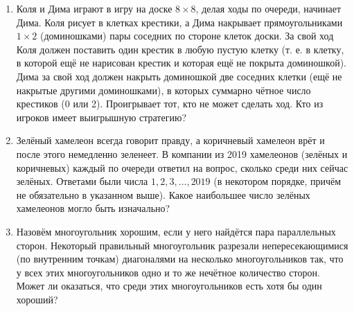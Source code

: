 \documentclass{article}
\begin{document}
\begin{enumerate}[label*=\protect\fbox{\arabic{enumi}}]
\item  Коля и Дима играют в игру на доске $8 \times 8$, делая ходы по очереди, начинает Дима. Коля рисует в клетках крестики, а Дима накрывает прямоугольниками $1 \times 2$ (доминошками) пары соседних по стороне клеток доски. За свой ход Коля должен поставить один крестик в любую пустую клетку (т. е. в клетку, в которой ещё не нарисован крестик и которая ещё не покрыта доминошкой). Дима за свой ход должен накрыть доминошкой две соседних клетки (ещё не накрытые другими доминошками), в которых суммарно чётное число крестиков (0 или 2). Проигрывает тот, кто не может сделать ход. Кто из игроков имеет выигрышную стратегию?

\item Зелёный хамелеон всегда говорит правду, а коричневый хамелеон врёт и после этого немедленно зеленеет. В компании из 2019 хамелеонов (зелёных и коричневых) каждый по очереди ответил на вопрос, сколько среди них сейчас зелёных. Ответами были числа $1, 2, 3, \dotsc, 2019$ (в некотором порядке, причём не обязательно в указанном выше). Какое наибольшее число зелёных хамелеонов могло быть изначально?

\item Назовём многоугольник хорошим, если у него найдётся пара параллельных сторон. Некоторый правильный многоугольник разрезали непересекающимися (по внутренним точкам) диагоналями на несколько многоугольников так, что у всех этих многоугольников одно и то же нечётное количество сторон. Может ли оказаться, что среди этих многоугольников есть хотя бы один хороший?

\end{enumerate}
\end{document}
